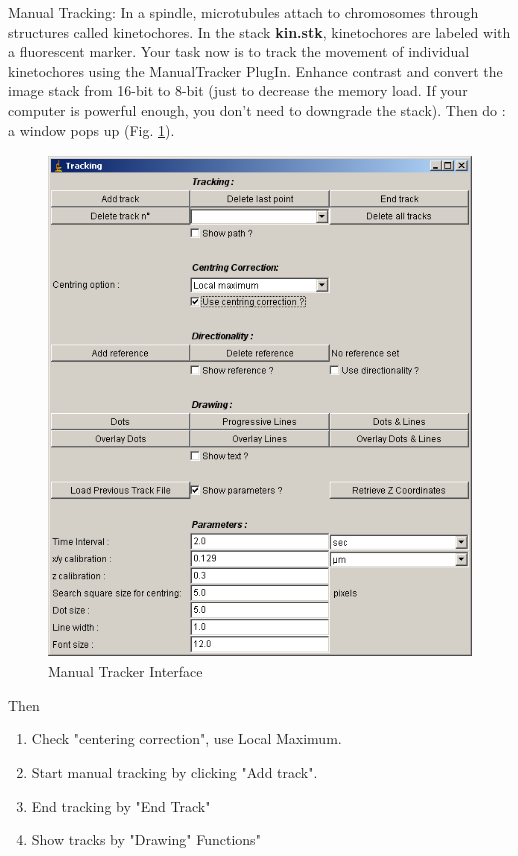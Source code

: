 \begin{indentexercise}{1}
\label{exer:manualtracking}
\item Manual Tracking: In a spindle, microtubules attach to chromosomes through structures called kinetochores. In the stack \textbf{kin.stk}, kinetochores are labeled with a fluorescent marker. Your task now is to track the movement of individual kinetochores using the ManualTracker PlugIn. Enhance contrast and convert the image stack from 16-bit to 8-bit (just to decrease the memory load. If your computer is powerful enough, you don't need to downgrade the stack). Then do : a window pops up (Fig. \ref{fig:img135}). 

\begin{figure}[H]
\begin{center}
\includegraphics[width=11.298cm,height=13.323cm]{img/CMCIBasicCourse201102-img135.png}
\caption{ Manual Tracker Interface}
\label{fig:img135}
\end{center}
\end{figure}

Then 
\begin{enumerate}
\item Check "centering correction", use Local Maximum.
\item Start manual tracking by clicking "Add track".
\item End tracking by "End Track"
\item Show tracks by "Drawing" Functions"
\end{enumerate}


\end{indentexercise}
